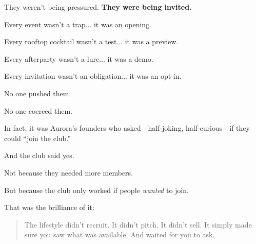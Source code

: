 \medskip



They weren’t being pressured.  \textbf{They were being invited.}

Every event wasn’t a trap... it was an opening.

Every rooftop cocktail wasn’t a test... it was a preview.  

Every afterparty wasn’t a lure... it was a demo.  

Every invitation wasn’t an obligation... it was an opt-in.

No one pushed them.

No one coerced them.

In fact, it was Aurora’s founders who asked—half-joking, half-curious—if they could “join the club.”

And the club said yes.

Not because they needed more members.

But because the club only worked if people \textit{wanted} to join.

\medskip

That was the brilliance of it:

\begin{quote}
The lifestyle didn’t recruit.  
It didn’t pitch.  
It didn’t sell.  
It simply made sure you saw what was available.  
And waited for you to ask.
\end{quote}

